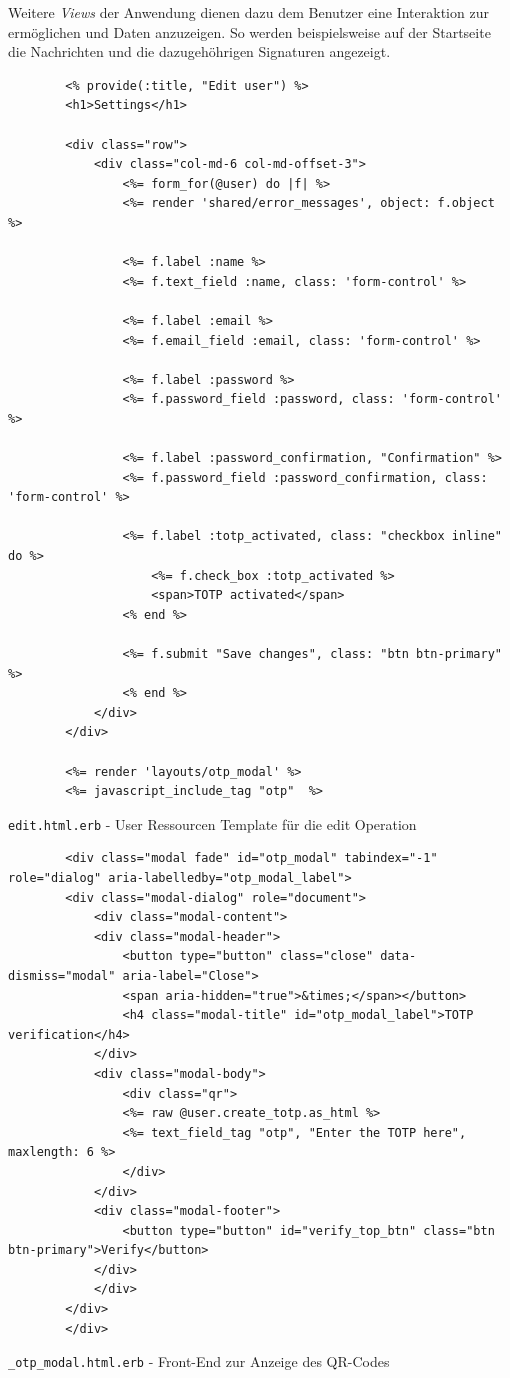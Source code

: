 \documentclass[11pt,a4paper,ngerman]{scrreprt}
\begin{document}
Weitere \textit{Views} der Anwendung dienen dazu dem Benutzer eine Interaktion zur ermöglichen und Daten anzuzeigen. So werden beispielsweise auf der Startseite die Nachrichten und die dazugehöhrigen Signaturen angezeigt.
\begin{listing}[htpb]
    \begin{verbatim}
        <% provide(:title, "Edit user") %>
        <h1>Settings</h1>

        <div class="row">
            <div class="col-md-6 col-md-offset-3">
                <%= form_for(@user) do |f| %>
                <%= render 'shared/error_messages', object: f.object %>

                <%= f.label :name %>
                <%= f.text_field :name, class: 'form-control' %>

                <%= f.label :email %>
                <%= f.email_field :email, class: 'form-control' %>

                <%= f.label :password %>
                <%= f.password_field :password, class: 'form-control' %>

                <%= f.label :password_confirmation, "Confirmation" %>
                <%= f.password_field :password_confirmation, class: 'form-control' %>

                <%= f.label :totp_activated, class: "checkbox inline" do %>
                    <%= f.check_box :totp_activated %>
                    <span>TOTP activated</span>
                <% end %>

                <%= f.submit "Save changes", class: "btn btn-primary" %>
                <% end %>
            </div>
        </div>

        <%= render 'layouts/otp_modal' %>
        <%= javascript_include_tag "otp"  %>
    \end{verbatim}
    \caption{\texttt{edit.html.erb} - User Ressourcen Template für die edit Operation}
    \label{lst:edit.html.erb}
\end{listing}
\begin{listing}[htpb]
    \begin{verbatim}
        <div class="modal fade" id="otp_modal" tabindex="-1" role="dialog" aria-labelledby="otp_modal_label">
        <div class="modal-dialog" role="document">
            <div class="modal-content">
            <div class="modal-header">
                <button type="button" class="close" data-dismiss="modal" aria-label="Close">
                <span aria-hidden="true">&times;</span></button>
                <h4 class="modal-title" id="otp_modal_label">TOTP verification</h4>
            </div>
            <div class="modal-body">
                <div class="qr">
                <%= raw @user.create_totp.as_html %>
                <%= text_field_tag "otp", "Enter the TOTP here", maxlength: 6 %>
                </div>
            </div>
            <div class="modal-footer">
                <button type="button" id="verify_top_btn" class="btn btn-primary">Verify</button>
            </div>
            </div>
        </div>
        </div>
    \end{verbatim}
    \caption{\texttt{\_otp\_modal.html.erb} - Front-End zur Anzeige des QR-Codes}
    \label{lst:otp_modal.html.erb}
\end{listing}
\end{document}
